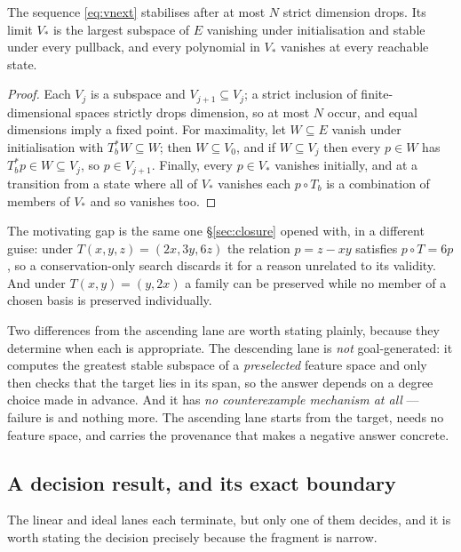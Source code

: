 \begin{theorem}
\label{thm:descending}
The sequence \eqref{eq:vnext} stabilises after at most $N$ strict dimension
drops. Its limit $V_*$ is the largest subspace of $E$ vanishing under
initialisation and stable under every pullback, and every polynomial in $V_*$
vanishes at every reachable state.
\end{theorem}
\begin{proof}
Each $V_j$ is a subspace and $V_{j+1}\subseteq V_j$; a strict inclusion of
finite-dimensional spaces strictly drops dimension, so at most $N$ occur, and
equal dimensions imply a fixed point. For maximality, let $W\subseteq E$ vanish
under initialisation with $T_b^{*}W\subseteq W$; then $W\subseteq V_0$, and if
$W\subseteq V_j$ then every $p\in W$ has $T_b^{*}p\in W\subseteq V_j$, so
$p\in V_{j+1}$. Finally, every $p\in V_*$ vanishes initially, and at a
transition from a state where all of $V_*$ vanishes each $p\circ T_b$ is a
combination of members of $V_*$ and so vanishes too.
\end{proof}

The motivating gap is the same one \S\ref{sec:closure} opened with, in a
different guise: under $T(x,y,z)=(2x,3y,6z)$ the relation $p=z-xy$ satisfies
$p\circ T=6p$, so a conservation-only search discards it for a reason unrelated
to its validity. And under $T(x,y)=(y,2x)$ a family can be preserved while no
member of a chosen basis is preserved individually.

Two differences from the ascending lane are worth stating plainly, because they
determine when each is appropriate. The descending lane is \emph{not}
goal-generated: it computes the greatest stable subspace of a \emph{preselected}
feature space and only then checks that the target lies in its span, so the
answer depends on a degree choice made in advance. And it has \emph{no
counterexample mechanism at all} --- failure is \unknown{} and nothing more.
The ascending lane starts from the target, needs no feature space, and carries
the provenance that makes a negative answer concrete.

\subsection{A decision result, and its exact boundary}

The linear and ideal lanes each terminate, but only one of them decides, and it
is worth stating the decision precisely because the fragment is narrow.

